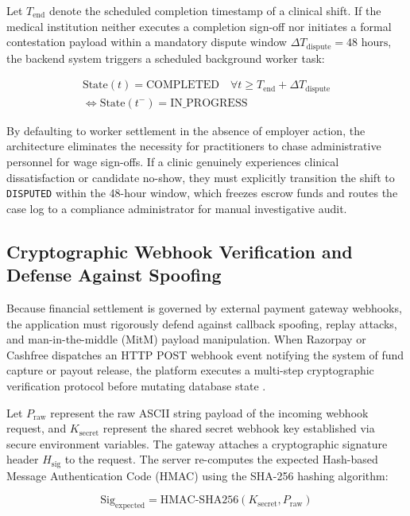 \documentclass[conference]{IEEEtran}
\begin{document}
Let $T_{\text{end}}$ denote the scheduled completion timestamp of a clinical shift. If the medical institution neither executes a completion sign-off nor initiates a formal contestation payload within a mandatory dispute window $\Delta T_{\text{dispute}} = 48\text{ hours}$, the backend system triggers a scheduled background worker task:

\begin{equation}
\begin{split}
\text{State}(t) = \text{COMPLETED} \quad \forall t \ge T_{\text{end}} + \Delta T_{\text{dispute}} \\
\iff \text{State}(t^-) = \text{IN\_PROGRESS}
\end{split}
\end{equation}

By defaulting to worker settlement in the absence of employer action, the architecture eliminates the necessity for practitioners to chase administrative personnel for wage sign-offs. If a clinic genuinely experiences clinical dissatisfaction or candidate no-show, they must explicitly transition the shift to \texttt{DISPUTED} within the 48-hour window, which freezes escrow funds and routes the case log to a compliance administrator for manual investigative audit.

\subsection{Cryptographic Webhook Verification and Defense Against Spoofing}
Because financial settlement is governed by external payment gateway webhooks, the application must rigorously defend against callback spoofing, replay attacks, and man-in-the-middle (MitM) payload manipulation. When Razorpay or Cashfree dispatches an HTTP POST webhook event notifying the system of fund capture or payout release, the platform executes a multi-step cryptographic verification protocol before mutating database state \cite{razorpay2024webhooks}.

Let $P_{\text{raw}}$ represent the raw ASCII string payload of the incoming webhook request, and $K_{\text{secret}}$ represent the shared secret webhook key established via secure environment variables. The gateway attaches a cryptographic signature header $H_{\text{sig}}$ to the request. The server re-computes the expected Hash-based Message Authentication Code (HMAC) using the SHA-256 hashing algorithm:

\begin{equation}
\text{Sig}_{\text{expected}} = \text{HMAC-SHA256}(K_{\text{secret}}, P_{\text{raw}})
\end{equation}
\end{document}
